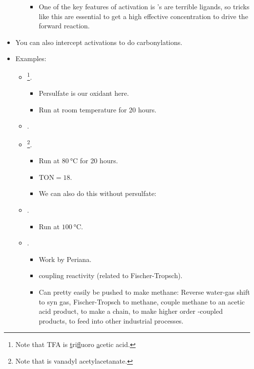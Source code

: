 \documentclass[../notes.tex]{subfiles}
\begin{document}
\begin{itemize}
\begin{itemize}
\begin{itemize}
            \item One of the key features of  activation is 's are terrible ligands, so tricks like this are essential to get a high effective concentration to drive the forward reaction.
        \end{itemize}
    \end{itemize}
    \item You can also intercept  activations to do carbonylations.
    \item Examples:
    \begin{itemize}
        \item {}\footnote{Note that TFA is \underline{t}ri\underline{f}luoro \underline{a}cetic acid.}.
        \begin{itemize}
            \item Persulfate is our oxidant here.
            \item Run at room temperature for 20 hours.
        \end{itemize}
        \item {}.
        \item {}\footnote{Note that  is vanadyl acetylacetanate.}.
        \begin{itemize}
            \item Run at $\SI{80}{\celsius}$ for 20 hours.
            \item $\text{TON}=18$.
            \item We can also do this without persulfate:
        \end{itemize}
        \item {}.
        \begin{itemize}
            \item Run at $\SI{100}{\celsius}$.
        \end{itemize}
        \item {}.
        \begin{itemize}
            \item Work by Periana.
            \item {} coupling reactivity (related to Fischer-Tropsch).
            \item Can pretty easily be pushed to make methane: Reverse water-gas shift to syn gas, Fischer-Tropsch to methane, couple methane to an acetic acid product, to make a chain, to make higher order -coupled products, to feed into other industrial processes.

\end{itemize}
\end{itemize}
\end{itemize}
\end{document}

